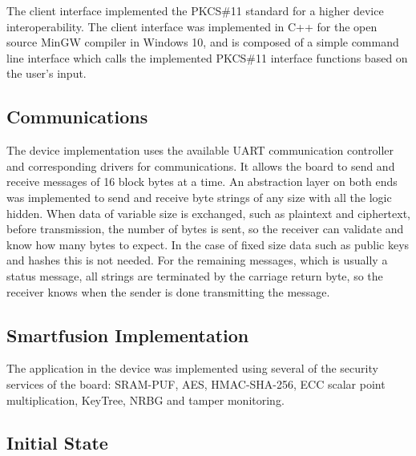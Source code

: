 The client interface implemented the \ac{PKCS}\#11 standard for a higher device interoperability. The client interface was implemented in C++ for the open source MinGW compiler in Windows 10, and is composed of a simple command line interface which calls the implemented \ac{PKCS}\#11 interface functions based on the user's input.

\subsection{Communications}\label{chap:implementation:app:comms}

The device implementation uses the available \ac{UART} communication controller and corresponding drivers for communications.
It allows the board to send and receive messages of 16 block bytes at a time.
An abstraction layer on both ends was implemented to send and receive byte strings of any size with all the logic hidden.
When data of variable size is exchanged, such as plaintext and ciphertext, before transmission, the number of bytes is sent, so the receiver can validate and know how many bytes to expect.
In the case of fixed size data such as public keys and hashes this is not needed. For the remaining messages, which is usually a status message, all strings are terminated by the carriage return byte, so the receiver knows when the sender is done transmitting the message.

\subsection{Smartfusion Implementation}\label{chap:implementation:app:board}

The application in the device was implemented using several of the security services of the board: SRAM-PUF, AES, HMAC-SHA-256, ECC scalar point multiplication, KeyTree, \ac{NRBG} and tamper monitoring.

\subsection{Initial State}\label{chap:implementation:protocol:initial-state}

